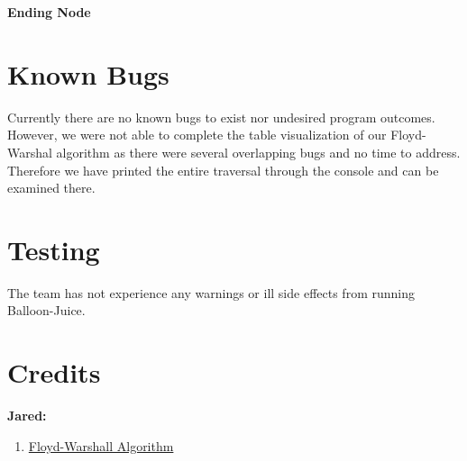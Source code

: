 \documentclass{article}
\begin{document}
\vspace*{7px}

\begin{center}
\large \textbf{Ending Node}


\end{center}

\section{Known Bugs}

Currently there are no known bugs to exist nor undesired program outcomes.
However, we were not able to complete the table visualization of our Floyd-Warshal algorithm as there were several overlapping bugs and no time to address.
Therefore we have printed the entire traversal through the console and can be examined there.


\section{Testing}

The team has not experience any warnings or ill side effects from running Balloon-Juice.

\newpage

\section{Credits}

\begin{flushleft}
\textbf{Jared:}

\begin{enumerate}
\item \href{https://en.wikipedia.org/wiki/Floyd-Warshall_algorithm}{Floyd-Warshall Algorithm}
\end{enumerate}
\end{flushleft}
\end{document}
